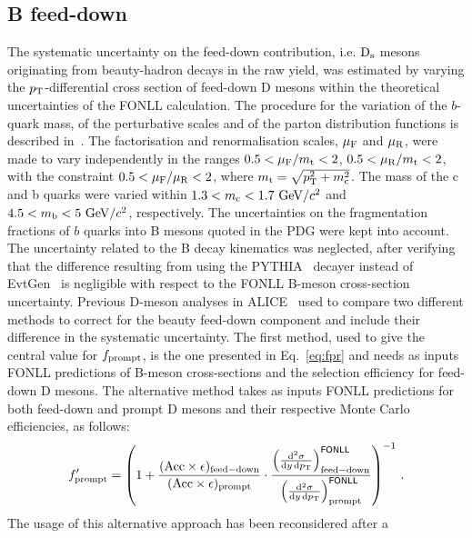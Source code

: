 \subsection{B feed-down}
\label{sec:BfdSub}
The systematic uncertainty on the feed-down contribution, i.e. ${\rm D_s}$ mesons
originating from beauty-hadron decays in the raw yield, was estimated by varying the $p_{\rm T}$-differential 
cross section of feed-down D mesons within the theoretical uncertainties
of the FONLL calculation. The procedure for the variation of the $b$-quark mass, 
of the perturbative scales and of the parton distribution functions is described 
in~\cite{Cacciari:2012ny}. The factorisation and renormalisation 
scales, $\mu_{\rm F}$ and $\mu_{\rm R}$, were made to vary independently 
in the ranges $0.5<\mu_{\rm F}/m_{\rm t}<2$, $0.5<\mu_{\rm R}/m_{\rm t}<2$, 
with the constraint $0.5<\mu_{\rm F}/\mu_{\rm R}<2$, 
where $m_{\rm t}=\sqrt{p_{\rm T}^2+m_{\rm c}^2}$.
The mass of the c and b quarks were varied within $1.3<m_{\rm c}<1.7~\mathrm{GeV}/c^2$ 
and $4.5<m_{\rm b}<5~\mathrm{GeV}/c^2$, respectively.
The uncertainties on the fragmentation fractions of $b$ quarks into B mesons 
quoted in the PDG were kept into account. The uncertainty related to the B decay 
kinematics was neglected, after verifying that the difference resulting 
from using the PYTHIA~\cite{Sjostrand:2006za} decayer instead of 
EvtGen~\cite{Lange:2001uf} is negligible 
with respect to the FONLL B-meson cross-section uncertainty.
Previous D-meson analyses in 
ALICE~\cite{ALICE:2011aa,Adam:2016ich,Adam:2015jda} 
used to compare two different methods to correct for the beauty feed-down component 
and include their difference in the systematic uncertainty. 
The first method, used to give the central value for $f_{\rm prompt}$, 
is the one presented in Eq.~\ref{eq:fpr} and needs as inputs FONLL predictions
of B-meson cross-sections and the selection efficiency for feed-down 
D mesons. The alternative method takes as inputs FONLL predictions for both 
feed-down and prompt D mesons and their respective Monte Carlo efficiencies, 
as follows:
\begin{equation}
f^\prime_{\rm prompt} = \left( 	1 + 	\frac{({\rm Acc}\times\epsilon)_{{\rm feed-down}}}{({\rm Acc}\times\epsilon)_{{\rm prompt}}}	\cdot
		 \frac{ \left(\frac{{\rm d}^2 \sigma}{{\rm d}y \, {\rm d} p_{\rm T} } \right)^{{\sf FONLL}}_{{\rm feed-down}} }{ \left(\frac{{\rm d}^2 \sigma}{{\rm d}y \, {\rm d} p_{\rm T} } \right)^{{\sf FONLL}}_{ {\rm prompt} } } 
\right)^{-1} \, .
\label{eq:fc}
\end{equation}
The usage of this alternative approach has been reconsidered after a
